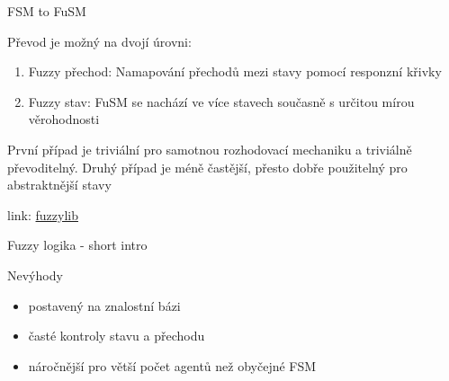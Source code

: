 ﻿\documentclass[a4paper]{beamer}
\begin{document}
\begin{frame}{FSM to FuSM}

Převod je možný na dvojí úrovni:

\begin{enumerate}
    \item Fuzzy přechod: Namapování přechodů mezi stavy pomocí responzní křivky 
    \item Fuzzy stav: FuSM se nachází ve více stavech současně s určitou mírou věrohodnosti
\end{enumerate}

První případ je triviální pro samotnou rozhodovací mechaniku a triviálně převoditelný. Druhý případ je méně častější, přesto dobře použitelný pro abstraktnější stavy

\vspace{2cm}

\centering\tiny
link: \href{http://www.byond.com/developer/hub/Gazoot/fuzzy_lib}{fuzzylib}
\end{frame}

\begin{frame}{Fuzzy logika - short intro}

Nevýhody

\begin{itemize}
    \item postavený na znalostní bázi
    \item časté kontroly stavu a přechodu
    \item náročnější pro větší počet agentů než obyčejné FSM
\end{itemize}
\end{frame}








\end{document}
